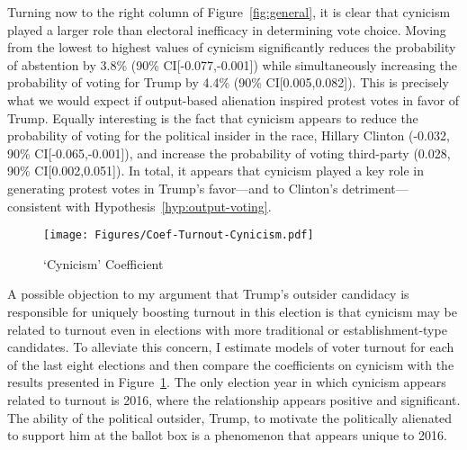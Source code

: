 \documentclass[12pt]{article}
\begin{document}
Turning now to the right column of Figure~\ref{fig:general}, it is clear that cynicism played a larger role than electoral inefficacy in determining vote choice. Moving from the lowest to highest values of cynicism significantly reduces the probability of abstention by 3.8\% (90\% CI[-0.077,-0.001]) while simultaneously increasing the probability of voting for Trump by 4.4\% (90\% CI[0.005,0.082]). This is precisely what we would expect if output-based alienation inspired protest votes in favor of Trump. Equally interesting is the fact that cynicism appears to reduce the probability of voting for the political insider in the race, Hillary Clinton (-0.032, 90\% CI[-0.065,-0.001]), and increase the probability of voting third-party (0.028, 90\% CI[0.002,0.051]). In total, it appears that cynicism played a key role in generating protest votes in Trump's favor---and to Clinton's detriment---consistent with Hypothesis~\ref{hyp:output-voting}.


\begin{figure}[t!]
    \centering
    \texttt{[image: Figures/Coef-Turnout-Cynicism.pdf]}
    \caption{{\small `Cynicism' Coefficient}}    
    \label{fig:turnoutcoef-cynicism}
\end{figure}

A possible objection to my argument that Trump's outsider candidacy is responsible for uniquely boosting turnout in this election is that cynicism may be related to turnout even in elections with more traditional or establishment-type candidates. To alleviate this concern, I estimate models of voter turnout for each of the last eight elections and then compare the coefficients on cynicism with the results presented in Figure~\ref{fig:turnoutcoef-cynicism}. The only election year in which cynicism appears related to turnout is 2016, where the relationship appears positive and significant. The ability of the political outsider, Trump, to motivate the politically alienated to support him at the ballot box is a phenomenon that appears unique to 2016. 




\end{document}
